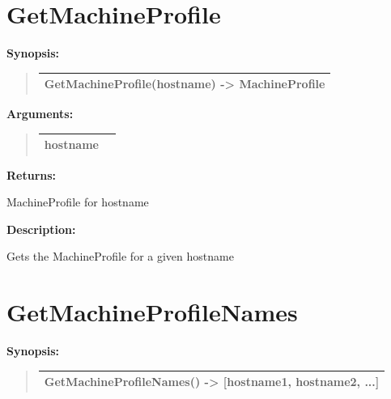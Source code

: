 \documentclass[letterpaper,10pt,english]{sphinxmanual}
\begin{document}
\section{GetMachineProfile}
\label{functions:getmachineprofile}
\begin{DUlineblock}{0em}
\item[] \textbf{Synopsis:}
\end{DUlineblock}
\begin{quote}

\begin{tabulary}{\linewidth}{|L|}
\hline

GetMachineProfile(hostname) -\textgreater{} MachineProfile
\\
\hline\end{tabulary}

\end{quote}

\begin{DUlineblock}{0em}
\item[] 
\item[] \textbf{Arguments:}
\end{DUlineblock}
\begin{quote}

\begin{tabulary}{\linewidth}{|L|L|}
\hline

hostname
 & \\
\hline\end{tabulary}

\end{quote}

\begin{DUlineblock}{0em}
\item[] 
\item[] \textbf{Returns:}
\item[] MachineProfile for hostname
\item[] 
\item[] \textbf{Description:}
\item[] Gets the MachineProfile for a given hostname
\end{DUlineblock}

\begin{DUlineblock}{0em}
\item[] 
\end{DUlineblock}


\section{GetMachineProfileNames}
\label{functions:getmachineprofilenames}
\begin{DUlineblock}{0em}
\item[] \textbf{Synopsis:}
\end{DUlineblock}
\begin{quote}

\begin{tabulary}{\linewidth}{|L|}
\hline

GetMachineProfileNames() -\textgreater{} {[}hostname1, hostname2, ...{]}
\\
\hline\end{tabulary}

\end{quote}
\end{document}
